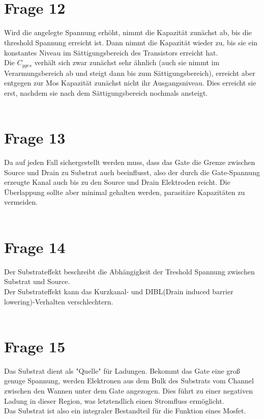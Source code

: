 \documentclass[a4paper]{scrartcl}
\begin{document}
~\\
~\\
\section*{Frage 12}
Wird die angelegte Spannung erhöht, nimmt die Kapazität zunächst ab, bis die threshold Spannung erreicht ist. Dann nimmt die Kapazität wieder zu, bis sie ein konstantes Niveau im Sättigungsbereich des Transistors erreicht hat.\\
Die $C_{gges}$ verhält sich zwar zunächst sehr ähnlich (auch sie nimmt im Verarmungsbereich ab und steigt dann bis zum Sättigungsbereich), erreicht aber entgegen zur Mos Kapazität zunächst nicht ihr Ausgangsniveau. Dies erreicht sie erst, nachdem sie nach dem Sättigungsbereich nochmals ansteigt. 
~\\
~\\
\section*{Frage 13}
Da auf jeden Fall sichergestellt werden muss, dass das Gate die Grenze zwischen Source und Drain zu Substrat auch beeinflusst, also der durch die Gate-Spannung erzeugte Kanal auch bis zu den Source und Drain Elektroden reicht. Die Überlappung sollte aber minimal gehalten werden, parasitäre Kapazitäten zu vermeiden.
~\\
~\\
\section*{Frage 14}
Der Substrateffekt beschreibt die Abhängigkeit der Treshold Spannung zwischen Substrat und Source.\\
Der Substrateffekt kann das Kurzkanal- und DIBL(Drain induced barrier lowering)-Verhalten verschlechtern.
~\\
~\\
\section*{Frage 15}
Das Substrat dient als "Quelle" für Ladungen. Bekommt das Gate eine groß genuge Spannung, werden Elektronen aus dem Bulk des Substrats vom Channel zwischen den Wannen unter dem Gate angezogen. Dies führt zu einer negativen Ladung in dieser Region, was letztendlich einen Stromfluss ermöglicht. \\
Das Substrat ist also ein integraler Bestandteil für die Funktion eines Mosfet.
~\\
~\\
\end{document}

